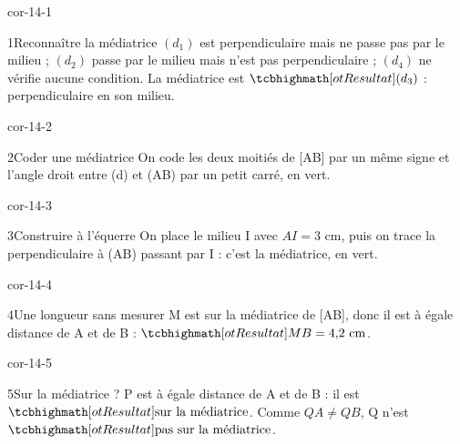 \clearpage\pagestyle{otMain}\setlength{\otBlocEspacement}{2.5mm}\fontsize{11}{15}\selectfont{}
\begin{blocLivre}{cor-14-1}\begin{corrige}{1}{Reconnaître la médiatrice}
$(d_1)$ est perpendiculaire mais ne passe pas par le milieu ; $(d_2)$ passe par le milieu mais n’est pas perpendiculaire ; $(d_4)$ ne vérifie aucune condition. La médiatrice est $\res{(d_3)}$ : perpendiculaire en son milieu.
\label{fig-cor-14-1}
\end{corrige}\end{blocLivre}
\begin{blocLivre}{cor-14-2}\begin{corrige}{2}{Coder une médiatrice}
On code les deux moitiés de [AB] par un même signe et l’angle droit entre (d) et (AB) par un petit carré, en vert.
\label{fig-cor-14-2}
\end{corrige}\end{blocLivre}
\begin{blocLivre}{cor-14-3}\begin{corrige}{3}{Construire à l’équerre}
On place le milieu I avec $AI=3$ cm, puis on trace la perpendiculaire à (AB) passant par I : c’est la médiatrice, en vert.
\label{fig-cor-14-3}
\end{corrige}\end{blocLivre}
\begin{blocLivre}{cor-14-4}\begin{corrige}{4}{Une longueur sans mesurer}
M est sur la médiatrice de [AB], donc il est à égale distance de A et de B : $\res{MB=4{,}2\ \mathrm{cm}}$.
\label{fig-cor-14-4}
\end{corrige}\end{blocLivre}
\begin{blocLivre}{cor-14-5}\begin{corrige}{5}{Sur la médiatrice ?}
P est à égale distance de A et de B : il est $\res{\text{sur la médiatrice}}$. Comme $QA\ne QB$, Q n’est $\res{\text{pas sur la médiatrice}}$.
\label{fig-cor-14-5}
\end{corrige}\end{blocLivre}

